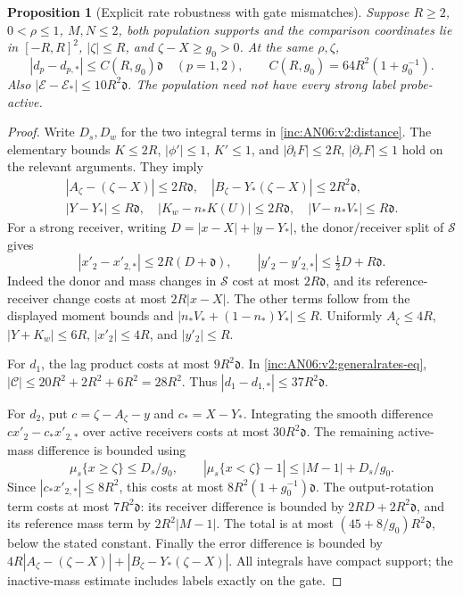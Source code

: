 \documentclass[11pt]{article}
\numberwithin{equation}{section}
\newtheorem{proposition}[theorem]{Proposition}
\theoremstyle{remark}\newtheorem{remark}[theorem]{Remark}
\newcommand{\1}{\mathbf 1}
\begin{document}
\begin{proposition}[Explicit rate robustness with gate mismatches]
\label{inc:AN06:v2:ratebound}
Suppose $R\ge2$, $0<\rho\le1$, $M,N\le2$, both population supports and
the comparison coordinates lie in $[-R,R]^2$, $|\zeta|\le R$, and
$\zeta-X\ge g_0>0$. At the same $\rho,\zeta$,
\begin{equation}\label{inc:AN06:v2:ratebound-eq}
 |d_p-d_{p,*}|\le C(R,g_0)\mathfrak d\quad(p=1,2),\qquad
 C(R,g_0)=64R^2(1+g_0^{-1}).
\end{equation}
Also $|\mathcal E-\mathcal E_*|\le10R^2\mathfrak d$.
The population need not have every strong label probe-active.
\end{proposition}
\begin{proof}
Write $D_s,D_w$ for the two integral terms in
\eqref{inc:AN06:v2:distance}. The elementary bounds
$K\le2R$, $|\phi'|\le1$, $K'\le1$, and
$|\partial_tF|\le2R$, $|\partial_rF|\le1$ hold on the relevant arguments.
They imply
\begin{gather*}
 |A_\zeta-(\zeta-X)|\le2R\mathfrak d,\quad
 |B_\zeta-Y_*(\zeta-X)|\le2R^2\mathfrak d,\\
 |Y-Y_*|\le R\mathfrak d,\quad
 |K_w-n_*K(U)|\le2R\mathfrak d,\quad
 |V-n_*V_*|\le R\mathfrak d.
\end{gather*}
For a strong receiver, writing $D=|x-X|+|y-Y_*|$, the donor/receiver split
of $\mathcal S$ gives
\[
 |x'_2-x'_{2,*}|\le2R(D+\mathfrak d),\qquad
 |y'_2-y'_{2,*}|\le\tfrac12D+R\mathfrak d.
\]
Indeed the donor and mass changes in $\mathcal S$ cost at most
$2R\mathfrak d$, and its reference-receiver change costs at most
$2R|x-X|$. The other terms follow from the displayed moment bounds and
$|n_*V_*+(1-n_*)Y_*|\le R$.
Uniformly $A_\zeta\le4R$, $|Y+K_w|\le6R$, $|x'_2|\le4R$, and
$|y'_2|\le R$.

For $d_1$, the lag product costs at most $9R^2\mathfrak d$.
In \eqref{inc:AN06:v2:generalrates-eq},
$|\mathcal C|\le20R^2+2R^2+6R^2=28R^2$.
Thus $|d_1-d_{1,*}|\le37R^2\mathfrak d$.

For $d_2$, put $c=\zeta-A_\zeta-y$ and $c_*=X-Y_*$.
Integrating the smooth difference $cx'_2-c_*x'_{2,*}$ over active
receivers costs at most $30R^2\mathfrak d$.
The remaining active-mass difference is bounded using
\[
 \mu_s\{x\ge\zeta\}\le D_s/g_0,\qquad
 |\mu_s\{x<\zeta\}-1|\le|M-1|+D_s/g_0.
\]
Since $|c_*x'_{2,*}|\le8R^2$, this costs at most
$8R^2(1+g_0^{-1})\mathfrak d$.
The output-rotation term costs at most $7R^2\mathfrak d$:
its receiver difference is bounded by $2RD+2R^2\mathfrak d$, and its
reference mass term by $2R^2|M-1|$.
The total is at most $(45+8/g_0)R^2\mathfrak d$, below the stated constant.
Finally the error difference is bounded by
$4R|A_\zeta-(\zeta-X)|+|B_\zeta-Y_*(\zeta-X)|$.
All integrals have compact support; the inactive-mass estimate includes
labels exactly on the gate.
\end{proof}
\end{document}
